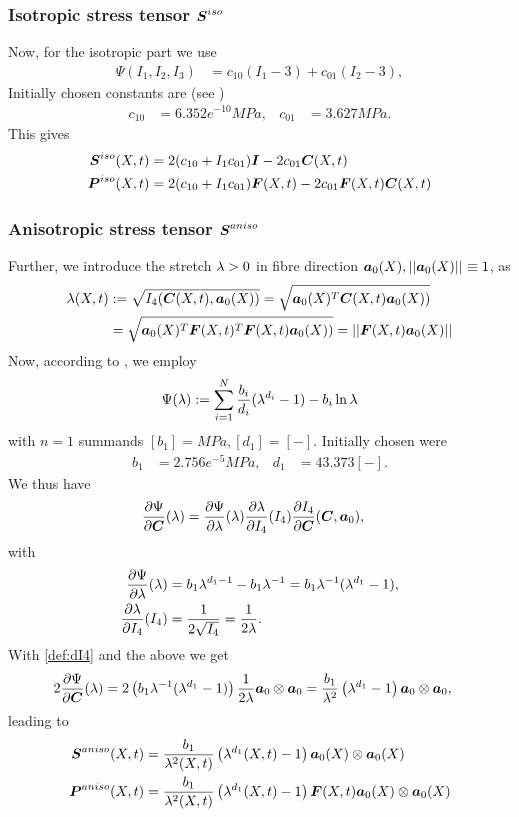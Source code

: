 \subsubsection{Isotropic stress tensor $\boldsymbol{S}^{iso}$}
Now, for the isotropic part we use
\begin{align*}
	\Psi(I_1,I_2,I_3) &= c_{10}(I_1-3) + c_{01}(I_2-3), 
\end{align*}
Initially chosen constants are (see \cite{Zheng1999})
\begin{align}
	c_{10} &= 6.352e^{-10}MPa, & c_{01} &= 3.627MPa.
\end{align}
This  gives
\begin{align}
	\boldsymbol{S}^{iso}(X,t) &= 2(c_{10} + I_1c_{01})\boldsymbol{I} - 2c_{01}\boldsymbol{C}(X,t)\\
	\boldsymbol{P}^{iso}(X,t) &= 2(c_{10} + I_1c_{01})\boldsymbol{F}(X,t) - 2c_{01}\boldsymbol{F}(X,t)\boldsymbol{C}(X,t)
\end{align}

\subsubsection{Anisotropic stress tensor $\boldsymbol{S}^{aniso}$}\label{sssec:aniso_stress}
Further, we introduce the stretch $\lambda > 0$ in fibre direction $\boldsymbol{a}_0(X), \left|\left|\boldsymbol{a}_0(X)\right|\right|_{} \equiv 1$, as
\begin{align}
	\lambda(X,t) &:= \sqrt{I_4(\boldsymbol{C}(X,t),\boldsymbol{a}_0(X))} = \sqrt{\boldsymbol{a}_0(X)^T\boldsymbol{C}(X,t)\boldsymbol{a}_0(X))}\\
	&= \sqrt{\boldsymbol{a}_0(X)^T\boldsymbol{F}(X,t)^T\boldsymbol{F}(X,t)\boldsymbol{a}_0(X))} = \left|\left|\boldsymbol{F}(X,t)\boldsymbol{a}_0(X)\right|\right|_{}\label{def:fibrestretch}
\end{align}
Now, according to \cite{Markert2005}, we employ
\begin{align}
	\Psi(\lambda) := \sum\limits_{i=1}^{N} \frac{b_i}{d_i}(\lambda^{d_i} - 1) - b_i\ln\lambda\label{def:markertlaw}
\end{align}
with $n=1$ summands $[b_1] = MPa, [d_1] = [-]$.
Initially chosen were 
\begin{align*}
	b_1 &= 2.756e^{-5}MPa, & d_1 &= 43.373 [-].
\end{align*}
We thus have
\begin{align}
	\frac{\partial \Psi}{\partial \boldsymbol{C}}(\lambda) &= \frac{\partial \Psi}{\partial \lambda}(\lambda)\frac{\partial \lambda}{\partial I_4}(I_4)\frac{\partial I_4}{\partial \boldsymbol{C}}(\boldsymbol{C},\boldsymbol{a}_0),\label{eq:dpsidC}
\end{align}
with
\begin{align*}
		 \frac{\partial \Psi}{\partial \lambda}(\lambda) &= b_1\lambda^{d_1-1} - b_1\lambda^{-1} = b_1\lambda^{-1}(\lambda^{d_1} - 1),\\
		 \frac{\partial \lambda}{\partial I_4}(I_4) &= \frac{1}{2\sqrt{I_4}} = \frac{1}{2\lambda}.
\end{align*}
With \eqref{def:dI4} and the above we get
\begin{align*}
	2\frac{\partial \Psi}{\partial \boldsymbol{C}}(\lambda) &= 2\left(b_1\lambda^{-1}(\lambda^{d_1} - 1)\right) \frac{1}{2\lambda}\boldsymbol{a}_0\otimes\boldsymbol{a}_0
	= \frac{b_1}{\lambda^2}\left(\lambda^{d_1} - 1\right) \boldsymbol{a}_0\otimes\boldsymbol{a}_0,
\end{align*}
leading to
\begin{align}
	\boldsymbol{S}^{aniso}(X,t) &= \frac{b_1}{\lambda^2(X,t)}\left(\lambda^{d_1}(X,t) - 1\right) \boldsymbol{a}_0(X)\otimes\boldsymbol{a}_0(X)\\
	\boldsymbol{P}^{aniso}(X,t) &= \frac{b_1}{\lambda^2(X,t)}\left(\lambda^{d_1}(X,t) - 1\right) \boldsymbol{F}(X,t)\boldsymbol{a}_0(X)\otimes\boldsymbol{a}_0(X)
\end{align}

